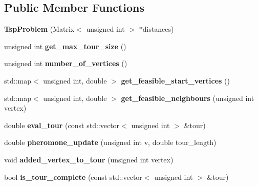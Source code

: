\subsection*{Public Member Functions}
\begin{DoxyCompactItemize}
\item 
\hypertarget{classTspProblem_aa83235d8f45df29e46310f200da1874f}{{\bfseries Tsp\-Problem} (Matrix$<$ unsigned int $>$ $\ast$distances)}\label{classTspProblem_aa83235d8f45df29e46310f200da1874f}

\item 
\hypertarget{classTspProblem_a23b73f500a498018220b43387d4ce9b7}{unsigned int {\bfseries get\-\_\-max\-\_\-tour\-\_\-size} ()}\label{classTspProblem_a23b73f500a498018220b43387d4ce9b7}

\item 
\hypertarget{classTspProblem_ac395626652825be2333401312b31d556}{unsigned int {\bfseries number\-\_\-of\-\_\-vertices} ()}\label{classTspProblem_ac395626652825be2333401312b31d556}

\item 
\hypertarget{classTspProblem_a06b643e4330618140448ea40866eaa4c}{std\-::map$<$ unsigned int, double $>$ {\bfseries get\-\_\-feasible\-\_\-start\-\_\-vertices} ()}\label{classTspProblem_a06b643e4330618140448ea40866eaa4c}

\item 
\hypertarget{classTspProblem_a24e9a8320098c090fdbe193106cce60d}{std\-::map$<$ unsigned int, double $>$ {\bfseries get\-\_\-feasible\-\_\-neighbours} (unsigned int vertex)}\label{classTspProblem_a24e9a8320098c090fdbe193106cce60d}

\item 
\hypertarget{classTspProblem_a5e2bbd95618635e2a23082d66646cfc9}{double {\bfseries eval\-\_\-tour} (const std\-::vector$<$ unsigned int $>$ \&tour)}\label{classTspProblem_a5e2bbd95618635e2a23082d66646cfc9}

\item 
\hypertarget{classTspProblem_a69027eff00a09f8791886cb4b74079cf}{double {\bfseries pheromone\-\_\-update} (unsigned int v, double tour\-\_\-length)}\label{classTspProblem_a69027eff00a09f8791886cb4b74079cf}

\item 
\hypertarget{classTspProblem_af9595b6b5ccb2acc960c8d1d75943754}{void {\bfseries added\-\_\-vertex\-\_\-to\-\_\-tour} (unsigned int vertex)}\label{classTspProblem_af9595b6b5ccb2acc960c8d1d75943754}

\item 
\hypertarget{classTspProblem_a94034be2774ce543db140a841e09c83a}{bool {\bfseries is\-\_\-tour\-\_\-complete} (const std\-::vector$<$ unsigned int $>$ \&tour)}\label{classTspProblem_a94034be2774ce543db140a841e09c83a}


\end{DoxyCompactItemize}
